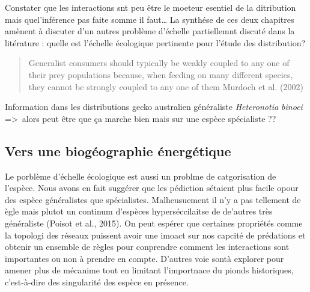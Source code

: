 Constater que les interactions snt peu être le moeteur esentiel de la
ditribution mais quel'inférence pas faite somme il faut\ldots{} La
synthése de ces deux chapitres amènent à discuter d'un autres problème
d'échelle partiellemnt discuté dans la litérature : quelle est l'échelle
écologique pertinente pour l'étude des distribution?

\begin{quote}
Generalist consumers should typically be weakly coupled to any one of
their prey populations because, when feeding on many different species,
they cannot be strongly coupled to any one of them Murdoch et al. (2002)
\end{quote}

Information dans les distributions gecko australien généraliste
\emph{Heteronotia binoei} =\textgreater{}~alors peut être que ça marche
bien mais sur une espèce spécialiste ??

\subsection*{Vers une biogéographie
énergétique}\label{vers-une-bioguxe9ographie-uxe9nerguxe9tique}

Le porblème d'échelle écologique est aussi un problme de catgorisation
de l'espèce. Nous avons en fait suggérer que les pédiction sétaient plus
facile opour des espèce généralistes que spécialistes. Malheusuement il
n'y a pas tellement de ègle mais plutot un continum d'espèces
hyperséccilaitse de de'autres très généraliste (Poisot et al., 2015). On
peut espérer que certaines propriétés comme la topologi des réseaux
puissent avoir une imoact sur nos capcité de prédations et obtenir un
ensemble de règles pour conprendre comment les interactions sont
importantes ou non à prendre en compte. D'autres voie sontà explorer
pour amener plus de mécanime tout en limitant l'importnace du pionds
historiques, c'est-à-dire des singularité des espèce en présence.

